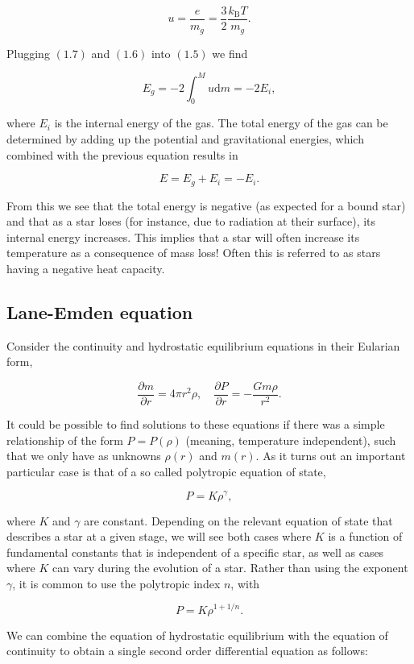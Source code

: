 \documentclass[twocolumn]{article}
\begin{document}
\[u=\frac{e}{m_g}=\frac{3}{2}\frac{k_\mathrm{B}T}{m_g}.\tag{1.7}\]

Plugging \((1.7)\) and \((1.6)\) into \((1.5)\) we find

\[E_g = -2\int_0^M u \mathrm{d}m=-2E_i,\]

where \(E_i\) is the internal energy of the gas. The total energy of the
gas can be determined by adding up the potential and gravitational
energies, which combined with the previous equation results in

\[E=E_g+E_i=-E_i.\]

From this we see that the total energy is negative (as expected for a
bound star) and that as a star loses (for instance, due to radiation at
their surface), its internal energy increases. This implies that a star
will often increase its temperature as a consequence of mass loss! Often
this is referred to as stars having a negative heat capacity.

\hypertarget{lane-emden-equation}{%
\subsection{Lane-Emden equation}\label{lane-emden-equation}}

Consider the continuity and hydrostatic equilibrium equations in their
Eularian form,

\[\frac{\partial m}{\partial r}=4\pi r^2 \rho,\quad \frac{\partial P}{\partial r}=-\frac{Gm\rho}{r^2}.\]

It could be possible to find solutions to these equations if there was a
simple relationship of the form \(P=P(\rho)\) (meaning, temperature
independent), such that we only have as unknowns \(\rho(r)\) and
\(m(r)\). As it turns out an important particular case is that of a so
called polytropic equation of state,

\[P=K\rho^\gamma,\]

where \(K\) and \(\gamma\) are constant. Depending on the relevant
equation of state that describes a star at a given stage, we will see
both cases where \(K\) is a function of fundamental constants that is
independent of a specific star, as well as cases where \(K\) can vary
during the evolution of a star. Rather than using the exponent
\(\gamma\), it is common to use the polytropic index \(n\), with

\[P=K\rho^{1+1/n}.\]

We can combine the equation of hydrostatic equilibrium with the equation
of continuity to obtain a single second order differential equation as
follows:
\end{document}

